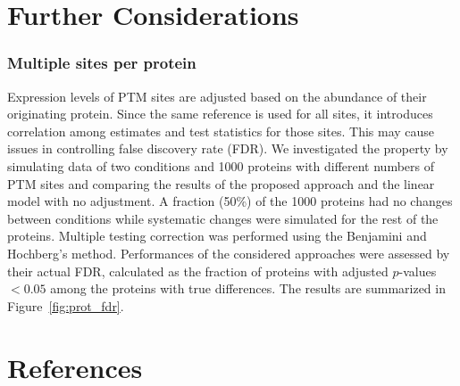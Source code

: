 \documentclass{mcp}
\def\sfigref#1{{Figure~\ref{#1}}}
\begin{document}
\clearpage

\section{Further Considerations}

\subsubsection{Multiple sites per protein}

Expression levels of PTM sites are adjusted based on the abundance of their originating protein. Since the same reference is used for all sites, it introduces correlation among estimates and test statistics for those sites. This may cause issues in controlling false discovery rate (FDR).
We investigated the property by simulating data of two conditions and 1000 proteins with different numbers of PTM sites and comparing the results of the proposed approach and the linear model with no adjustment. 
A fraction (50\%) of the 1000 proteins had no changes between conditions while systematic changes were simulated for the rest of the proteins. Multiple testing correction was performed using the Benjamini and Hochberg's method. 
Performances of the considered approaches were assessed by their actual FDR, calculated as the fraction of proteins with adjusted $p$-values $<0.05$ among the proteins with true differences. The results are summarized in \sfigref{fig:prot_fdr}.

\clearpage
\section*{References}



\end{document}
